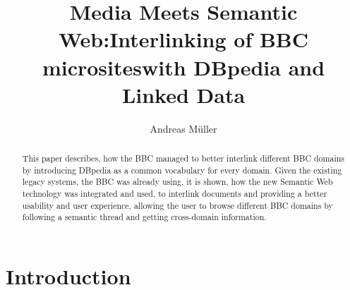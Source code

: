 \documentclass{llncs}
\begin{document}
%
\frontmatter          %
%
\pagestyle{headings}  %
%
\mainmatter              %
%
\title{Media Meets Semantic Web:\newline Interlinking of BBC microsites\newline with DBpedia and Linked Data}
%
%
\author{Andreas M\"{u}ller}
%
%
%

\maketitle              %

\begin{abstract} %
This paper describes, how the BBC managed to better interlink different BBC domains by introducing DBpedia as a common vocabulary for every domain. Given the existing legacy systems, the BBC was already using, it is shown, how the new Semantic Web technology was integrated and used, to interlink documents and providing a better usability and user experience, allowing the user to browse different BBC domains by following a semantic thread and getting cross-domain information.
\end{abstract}

\section{Introduction}
\end{document}
